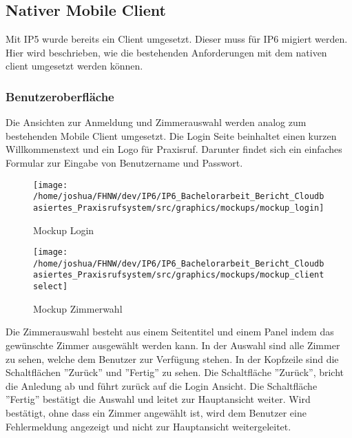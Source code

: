 \subsection{Nativer Mobile Client}

Mit IP5 wurde bereits ein Client umgesetzt.
Dieser muss für IP6 migiert werden.
Hier wird beschrieben, wie die bestehenden Anforderungen mit dem nativen client umgesetzt werden können.

\subsubsection{Benutzeroberfläche}

Die Ansichten zur Anmeldung und Zimmerauswahl werden analog zum bestehenden Mobile Client umgesetzt.
Die Login Seite beinhaltet einen kurzen Willkommenstext und ein Logo für Praxisruf.
Darunter findet sich ein einfaches Formular zur Eingabe von Benutzername und Passwort.

\begin{figure}[h]
    \centering
    \begin{minipage}[b]{0.4\textwidth}
        \texttt{[image: /home/joshua/FHNW/dev/IP6/IP6\_Bachelorarbeit\_Bericht\_Cloudbasiertes\_Praxisrufsystem/src/graphics/mockups/mockup\_login]}
        \caption{Mockup Login}
    \end{minipage}
    \hfill
    \begin{minipage}[b]{0.4\textwidth}
        \texttt{[image: /home/joshua/FHNW/dev/IP6/IP6\_Bachelorarbeit\_Bericht\_Cloudbasiertes\_Praxisrufsystem/src/graphics/mockups/mockup\_clientselect]}
        \caption{Mockup Zimmerwahl}
    \end{minipage}\label{fig:Mockups-Login-ClientSelection}
\end{figure}

Die Zimmerauswahl besteht aus einem Seitentitel und einem Panel indem das gewünschte Zimmer ausgewählt werden kann.
In der Auswahl sind alle Zimmer zu sehen, welche dem Benutzer zur Verfügung stehen.
In der Kopfzeile sind die Schaltflächen ''Zurück'' und ''Fertig'' zu sehen.
Die Schaltfläche ''Zurück'', bricht die Anledung ab und führt zurück auf die Login Ansicht.
Die Schaltfläche ''Fertig'' bestätigt die Auswahl und leitet zur Hauptansicht weiter.
Wird bestätigt, ohne dass ein Zimmer angewählt ist, wird dem Benutzer eine Fehlermeldung angezeigt und nicht zur Hauptansicht weitergeleitet.

\clearpage

